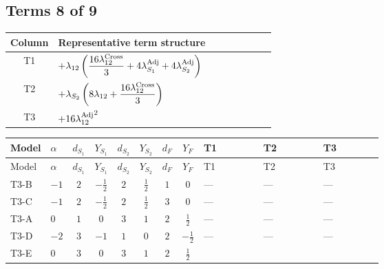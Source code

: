 \documentclass[8pt]{article}
\begin{document}
\begin{landscape}
\subsection*{Terms 8 of 9}
\begin{center}
\begin{tabular}{@{}c >{\raggedright\arraybackslash}p{0.82\linewidth}@{}}
\toprule
Column & Representative term structure \\
\midrule
T1 & \(\displaystyle +{\lambda_{12}} \left(\frac{16 {\lambda_{12}^{\rm Cross}}}{3}+4 {\lambda_{S_1}^{\rm Adj}}+4 {\lambda_{S_2}^{\rm Adj}}\right)\) \\
\midrule
T2 & \(\displaystyle +{\lambda_{S_2}} \left(8 {\lambda_{12}}+\frac{16 {\lambda_{12}^{\rm Cross}}}{3}\right)\) \\
\midrule
T3 & \(\displaystyle +16 {\lambda_{12}^{\rm Adj}}^2\) \\
\midrule
\bottomrule
\end{tabular}
\end{center}
\smallskip
\tiny
\begin{longtable}{@{}llcccccc >{\raggedright\arraybackslash}p{0.21\linewidth} >{\raggedright\arraybackslash}p{0.21\linewidth} >{\raggedright\arraybackslash}p{0.21\linewidth}@{}}
\toprule
Model & $\alpha$ & $d_{S_1}$ & $Y_{S_1}$ & $d_{S_2}$ & $Y_{S_2}$ & $d_F$ & $Y_F$ & T1 & T2 & T3 \\
\midrule
\endfirsthead
\toprule
Model & $\alpha$ & $d_{S_1}$ & $Y_{S_1}$ & $d_{S_2}$ & $Y_{S_2}$ & $d_F$ & $Y_F$ & T1 & T2 & T3 \\
\midrule
\endhead
T3-B & $-1$ & $2$ & $-\frac{1}{2}$ & $2$ & $\frac{1}{2}$ & $1$ & $0$ & --- & --- & --- \\
\midrule
T3-C & $-1$ & $2$ & $-\frac{1}{2}$ & $2$ & $\frac{1}{2}$ & $3$ & $0$ & --- & --- & --- \\
\midrule
T3-A & $0$ & $1$ & $0$ & $3$ & $1$ & $2$ & $\frac{1}{2}$ & --- & --- & --- \\
\midrule
T3-D & $-2$ & $3$ & $-1$ & $1$ & $0$ & $2$ & $-\frac{1}{2}$ & --- & --- & --- \\
\midrule
T3-E & $0$ & $3$ & $0$ & $3$ & $1$ & $2$ & $\frac{1}{2}$ & \scriptsize\adjustbox{max width=\linewidth}{$\begin{gathered} +{\lambda_{12}} \left(\frac{16 {\lambda_{12}^{\rm Cross}}}{3}+4 {\lambda_{S_1}^{\rm Adj}}+4 {\lambda_{S_2}^{\rm Adj}}\right)\end{gathered}$} & \scriptsize\adjustbox{max width=\linewidth}{$\begin{gathered} +{\lambda_{S_2}} \left(8 {\lambda_{12}}+\frac{16 {\lambda_{12}^{\rm Cross}}}{3}\right)\end{gathered}$} & \scriptsize\adjustbox{max width=\linewidth}{$\begin{gathered} +16 {\lambda_{12}^{\rm Adj}}^2\end{gathered}$} \\
\midrule
\bottomrule
\end{longtable}
\clearpage

\end{landscape}
\end{document}
